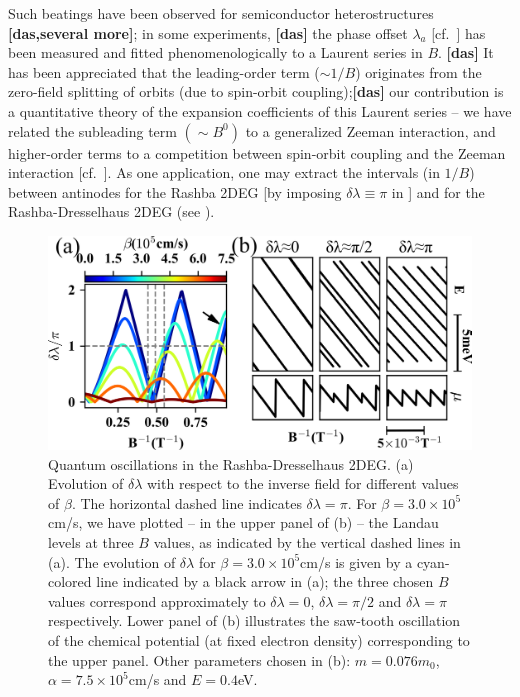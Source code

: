 \documentclass[aps, prb, showpacs, twocolumn, notitlepage, superscriptaddress]{revtex4-1}
\begin{document}
Such beatings have been observed for semiconductor heterostructures \textbf{[das,several more]}; in some experiments, \textbf{[das]} the phase offset $\lambda_a$ [cf.\ ] has been measured and fitted phenomenologically to a Laurent series in $B$. \textbf{[das]} It has been appreciated that the leading-order term (${\sim}1/B$) originates from the zero-field splitting of orbits (due to spin-orbit coupling);\textbf{[das]} our contribution is a quantitative theory of the expansion coefficients of this Laurent series -- we have related the subleading term  $({\sim}B^0)$ to a generalized Zeeman interaction, and higher-order terms to a competition between spin-orbit coupling and the Zeeman interaction [cf.\ ]. As one application, one may extract the intervals (in $1/B$) between antinodes  for the Rashba 2DEG [by imposing $\delta \lambda{\equiv}\pi$ in ] and for the Rashba-Dresselhaus 2DEG (see ).




\begin{figure}
\includegraphics[width=1.0\columnwidth]{qo.png}
\caption{Quantum oscillations in the Rashba-Dresselhaus 2DEG. (a) Evolution of $\delta\lambda$ with respect to the inverse field for different values of $\beta$. The horizontal dashed line indicates $\delta\lambda=\pi$. For $\beta=3.0\times 10^{5}$cm/s, we have plotted -- in the upper panel of (b) -- the Landau levels at three $B$ values, as indicated by the vertical dashed lines in (a). The evolution of $\delta \lambda$ for $\beta=3.0\times 10^{5}$cm/s is given by a cyan-colored line indicated by a black arrow in (a); the three chosen $B$ values correspond approximately to  $\delta\lambda{=}0$, $\delta\lambda{=}\pi/2$ and $\delta\lambda{=}\pi$ respectively. Lower panel of (b) illustrates the saw-tooth oscillation of the chemical potential (at fixed electron density) corresponding to the upper panel. Other parameters chosen in (b): $m{=}0.076m_0$, $\alpha{=}7.5\times10^{5}$cm/s and $E=0.4$eV.
\label{fig:qo}}
\end{figure}
\end{document}
